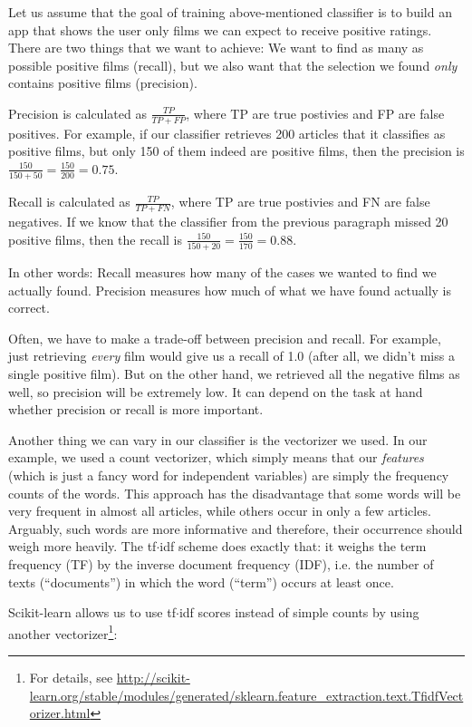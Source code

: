 \documentclass[a4paper,12pt]{book}
\begin{document}
Let us assume that the goal of training above-mentioned classifier is to build an app that shows the user only films we can expect to receive positive ratings. There are two things that we want to achieve: We want to find as many as possible positive films (recall), but we also want that the selection we found \emph{only} contains positive films (precision).

Precision is calculated as $\frac{TP}{TP+FP}$, where TP are true postivies and FP are false positives. For example, if our classifier retrieves 200 articles that it classifies as positive films, but only 150 of them indeed are positive films, then the precision is $\frac{150}{150+50} = \frac{150}{200} = 0.75$.

Recall is calculated as $\frac{TP}{TP+FN}$, where TP are true postivies and FN are false negatives. If we know that the classifier from the previous paragraph missed 20 positive films, then the recall is $\frac{150}{150+20} = \frac{150}{170}= 0.88$.

In other words: Recall measures how many of the cases we wanted to find we actually found. Precision measures how much of what we have found actually is correct.

Often, we have to make a trade-off between precision and recall. For example, just retrieving \emph{every} film would give us a recall of 1.0 (after all, we didn't miss a single positive film). But on the other hand, we retrieved all the negative films as well, so precision will be extremely low. It can depend on the task at hand whether precision or recall is more important.

Another thing we can vary in our classifier is the vectorizer we used. In our example, we used a count vectorizer, which simply means that our \emph{features} (which is just a fancy word for independent variables) are simply the frequency counts of the words. This approach has the disadvantage that some words will be very frequent in almost all articles, while others occur in only a few articles. Arguably, such words are more informative and therefore, their occurrence should weigh more heavily. The tf$\cdot$idf scheme does exactly that: it weighs the term frequency (TF) by the inverse document frequency (IDF), i.e. the number of texts (``documents'') in which the word (``term'') occurs at least once.

Scikit-learn allows us to use tf$\cdot$idf scores instead of simple counts by using another vectorizer\footnote{For details, see \url{http://scikit-learn.org/stable/modules/generated/sklearn.feature_extraction.text.TfidfVectorizer.html}}:
\end{document}
